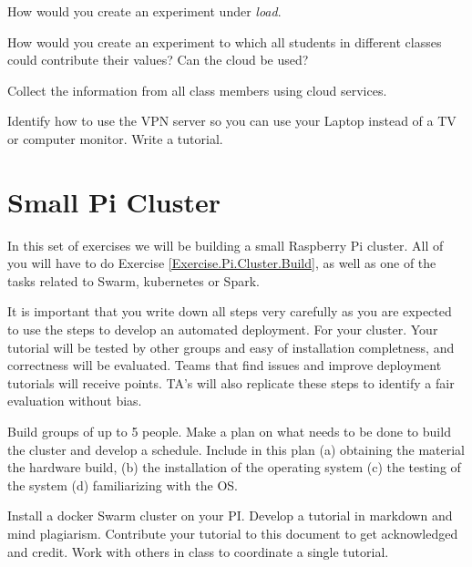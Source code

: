 \begin{exercise}\label{E:.Pi.Single.2} 
How would you create an experiment under \textit{load}.
\end{exercise}

\begin{exercise}\label{E:.Pi.Single.3} 
How would you create an experiment to which all
  students in different classes could contribute their values? Can the
  cloud be used?
\end{exercise}

\begin{exercise}\label{E:.Pi.Single.4} 
Collect the information from all class members
  using cloud services.
\end{exercise}

\begin{exercise}\label{E:.Pi.Single.5} 
Identify how to use the VPN server so you can
  use your Laptop instead of a TV or computer monitor. Write a
  tutorial.
\end{exercise}



\section{Small Pi Cluster}

In this set of exercises we will be building a small Raspberry Pi
cluster. All of you will have to do Exercise
\ref{Exercise.Pi.Cluster.Build}, as well as one of the tasks related
to Swarm, kubernetes or Spark.

It is important that you write down all steps very carefully as you
are expected to use the steps to develop an automated deployment. For
your cluster. Your tutorial will be tested by other groups and easy of
installation completness, and correctness will be evaluated.  Teams
that find issues and improve deployment tutorials will receive points.
TA's will also replicate these steps to identify a fair evaluation
without bias.


\begin{exercise}\label{E:.Pi.Cluster.Build} 
  Build groups of up to 5 people. Make a
  plan on what needs to be done to build the cluster and develop a
  schedule. Include in this plan (a) obtaining the material the
  hardware build, (b) the installation of the operating system (c) the
  testing of the system (d) familiarizing with the OS.
\end{exercise}

\begin{exercise}\label{E:.Pi.Cluster.DockerSwarm} 
  Install a docker Swarm cluster on
  your PI. Develop a tutorial in markdown and mind
  plagiarism. Contribute your tutorial to this document to get
  acknowledged and credit. Work with others in class to coordinate a
  single tutorial.
\end{exercise}

